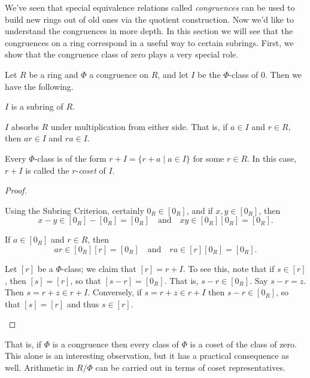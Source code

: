 We've seen that special equivalence relations called \emph{congruences} can be used to build new rings out of old ones via the quotient construction.
Now we'd like to understand the congruences in more depth.
In this section we will see that the congruences on a ring correspond in a useful way to certain subrings.
First, we show that the congruence class of zero plays a very special role.

\begin{prop}
Let \(R\) be a ring and \(\Phi\) a congruence on \(R\), and let \(I\) be the \(\Phi\)-class of 0.
Then we have the following.
\begin{proplist}
\item \(I\) is a subring of \(R\).
\item \(I\) absorbs \(R\) under multiplication from either side.
That is, if \(a \in I\) and \(r \in R\), then \(ar \in I\) and \(ra \in I\).
\item Every \(\Phi\)-class is of the form \(r + I = \{ r+a \mid a \in I \}\) for some \(r \in R\).
In this case, \(r+I\) is called the \(r\)-\emph{coset} of \(I\).
\end{proplist}
\end{prop}

\begin{proof}
\begin{inlineproplist}
\item Using the Subring Criterion, certainly \(0_R \in [0_R]\), and if \(x,y \in [0_R]\), then \[ x-y \in [0_R] - [0_R] = [0_R] \quad \mathrm{and} \quad xy \in [0_R][0_R] = [0_R]. \]
\item If \(a \in [0_R]\) and \(r \in R\), then \[ ar \in [0_R][r] = [0_R] \quad \mathrm{and} \quad ra \in [r][0_R] = [0_R]. \]
\item Let \([r]\) be a \(\Phi\)-class; we claim that \([r] = r + I\).
To see this, note that if \(s \in [r]\), then \([s] = [r]\), so that \([s-r] = [0_R]\).
That is, \(s-r \in [0_R]\).
Say \(s-r = z\).
Then \(s = r+z \in r+I\).
Conversely, if \(s = r+z \in r+I\) then \(s-r \in [0_R]\), so that \([s] = [r]\) and thus \(s \in [r]\).
\end{inlineproplist}
\end{proof}

That is, if \(\Phi\) is a congruence then every class of \(\Phi\) is a coset of the class of zero.
This alone is an interesting observation, but it has a practical consequence as well.
Arithmetic in \(R/\Phi\) can be carried out in terms of coset representatives.

